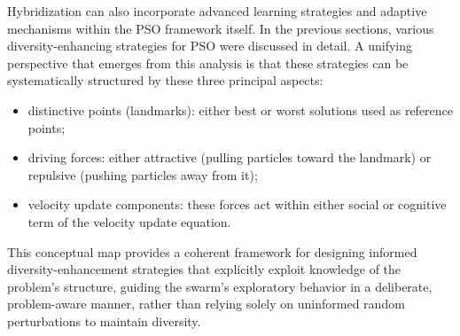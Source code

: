 {Hybridization can also incorporate advanced learning strategies and adaptive mechanisms within the PSO framework itself.
In the previous sections, various diversity\-\mbox{-enhancing} strategies for PSO were discussed in detail. A unifying perspective that emerges from this analysis is that these strategies can be systematically structured by these three principal aspects: 
\begin{itemize}
    \item distinctive points (landmarks): either best or worst solutions used as reference points;
    \item driving forces: either attractive (pulling particles toward the landmark) or repulsive (pushing particles away from it);
    \item velocity update components: these forces act within either social or cognitive term of the velocity update equation.
\end{itemize}
This conceptual map provides a coherent framework for designing informed diversity\--enhancement strategies that explicitly exploit knowledge of the problem’s structure, guiding the swarm’s exploratory behavior in a deliberate, problem-aware manner, rather than relying solely on uninformed random perturbations to maintain diversity.


}
